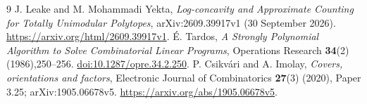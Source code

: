 \documentclass[11pt]{article}
\begin{document}
\begin{thebibliography}{9}
 J. Leake and M. Mohammadi Yekta,
\emph{Log-concavity and Approximate Counting for Totally Unimodular Polytopes},
arXiv:2609.39917v1 (30 September 2026).
\url{https://arxiv.org/html/2609.39917v1}.
 \'E. Tardos,
\emph{A Strongly Polynomial Algorithm to Solve Combinatorial Linear Programs},
Operations Research \textbf{34}(2) (1986),250--256.
\href{https://doi.org/10.1287/opre.34.2.250}{doi:10.1287/opre.34.2.250}.
 P. Csikv\'ari and A. Imolay,
\emph{Covers, orientations and factors},
Electronic Journal of Combinatorics \textbf{27}(3) (2020), Paper 3.25;
arXiv:1905.06678v5.
\url{https://arxiv.org/abs/1905.06678v5}.
\end{thebibliography}
\end{document}

